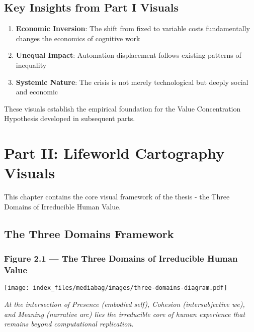 \documentclass[
  a4paper,
]{report}
\providecommand{\tightlist}{%
  \setlength{\itemsep}{0pt}\setlength{\parskip}{0pt}}
\begin{document}
\section{Key Insights from Part I
Visuals}\label{key-insights-from-part-i-visuals}

\begin{enumerate}
\def\labelenumi{\arabic{enumi}.}
\tightlist
\item
  \textbf{Economic Inversion}: The shift from fixed to variable costs
  fundamentally changes the economics of cognitive work
\item
  \textbf{Unequal Impact}: Automation displacement follows existing
  patterns of inequality
\item
  \textbf{Systemic Nature}: The crisis is not merely technological but
  deeply social and economic
\end{enumerate}

These visuals establish the empirical foundation for the Value
Concentration Hypothesis developed in subsequent parts.


\chapter{Part II: Lifeworld Cartography
Visuals}\label{part-ii-lifeworld-cartography-visuals}

This chapter contains the core visual framework of the thesis - the
Three Domains of Irreducible Human Value.

\section{The Three Domains Framework}\label{the-three-domains-framework}

\subsection{Figure 2.1 --- The Three Domains of Irreducible Human
Value}\label{figure-2.1-the-three-domains-of-irreducible-human-value}

\texttt{[image: index\_files/mediabag/images/three-domains-diagram.pdf]}

\emph{At the intersection of Presence (embodied self), Cohesion
(intersubjective we), and Meaning (narrative arc) lies the irreducible
core of human experience that remains beyond computational replication.}
\end{document}
